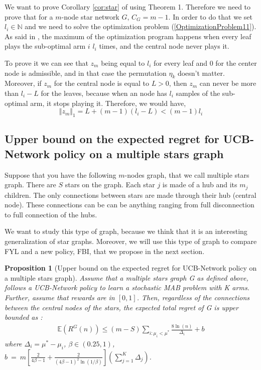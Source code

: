 \documentclass{article}
\newtheorem{proposition}{Proposition}
\begin{document}
We want to prove Corollary \ref{cor:star} of \cite{DBLP:journals/corr/KollaJG16} using Theorem 1. Therefore we need to prove that for a $m$-node star network $G$, $C_G = m-1$. In order to do that we set $l_i \in \mathbb{N}$ and we need to solve the optimization problem (\ref{OptimizationProblem11}). As said in \cite{DBLP:journals/corr/KollaJG16}, the maximum of the optimization program happens when every leaf plays the sub-optimal arm $i$ $l_i$ times, and the central node never plays it.

To prove it we can see that $z_m$ being equal to $l_i$ for every leaf and 0 for the center node is admissible, and in that case the permutation $\eta_k$ doesn't matter. Moreover, if $z_m$ for the central node is equal to $L > 0$, then $z_m$ can never be more than $l_i - L$ for the leaves, because when an node has $l_i$ samples of the sub-optimal arm, it stops playing it. Therefore, we would have, $$\Vert z_m \Vert_1 = L + (m-1)(l_i -L) < (m-1)l_i$$

\subsection{Upper bound on the expected regret for UCB-Network policy on a multiple stars graph}

Suppose that you have the following $m$-nodes graph, that we call multiple stars graph. There are $S$ stars on the graph. Each star $j$ is made of a hub and its $m_j$ children. The only connections between stars are made through their hub (central node). These connections can be can be anything ranging from full disconnection to full connection of the hubs.

We want to study this type of graph, because we think that it is an interesting generalization of star graphs. Moreover, we will use this type of graph to compare FYL and a new policy, FBI, that we propose in the next section.

\begin{proposition}[Upper bound on the expected regret for UCB-Network policy on a multiple stars graph]
  Assume that  a multiple stars graph G as defined above, follows a UCB-Network policy to learn a stochastic MAB problem with K arms. Further, assume that rewards are in $[0, 1]$. Then, regardless of the connections between the central nodes of the stars, the expected total regret of G is upper bounded as :
  \begin{align*}
    \mathbb{E}(R^G(n)) \leq \left( m - S \right) \sum_{i:\mu_i< \mu^*} \frac{8\ln(n)}{\Delta_i}  + b
  \end{align*}
  where $\Delta_i = \mu^* - \mu_i$, $\beta \in (0.25,1)$, $b~=~m \left[ \frac{2}{4\beta -1} + \frac{2}{(4\beta-1)^2 \ln(1/\beta)} \right] \left( \sum\limits_{j=1}^K \Delta_j \right)$.
\end{proposition}
\end{document}
